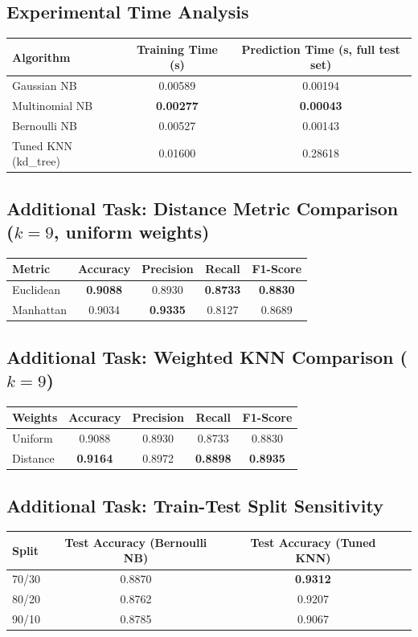 \documentclass[12pt,a4paper]{article}
\begin{document}
\subsection*{Experimental Time Analysis}
\begin{tabular}{lcc}
\toprule
Algorithm & Training Time (s) & Prediction Time (s, full test set) \\
\midrule
Gaussian NB & 0.00589 & 0.00194 \\
Multinomial NB & \textbf{0.00277} & \textbf{0.00043} \\
Bernoulli NB & 0.00527 & 0.00143 \\
Tuned KNN (kd\_tree) & 0.01600 & 0.28618 \\
\bottomrule
\end{tabular}

\subsection*{Additional Task: Distance Metric Comparison ($k=9$, uniform weights)}
\begin{tabular}{lcccc}
\toprule
Metric & Accuracy & Precision & Recall & F1-Score \\
\midrule
Euclidean & \textbf{0.9088} & 0.8930 & \textbf{0.8733} & \textbf{0.8830} \\
Manhattan & 0.9034 & \textbf{0.9335} & 0.8127 & 0.8689 \\
\bottomrule
\end{tabular}

\subsection*{Additional Task: Weighted KNN Comparison ($k=9$)}
\begin{tabular}{lcccc}
\toprule
Weights & Accuracy & Precision & Recall & F1-Score \\
\midrule
Uniform  & 0.9088 & 0.8930 & 0.8733 & 0.8830 \\
Distance & \textbf{0.9164} & 0.8972 & \textbf{0.8898} & \textbf{0.8935} \\
\bottomrule
\end{tabular}

\subsection*{Additional Task: Train-Test Split Sensitivity}
\begin{tabular}{lccc}
\toprule
Split & Test Accuracy (Bernoulli NB) & Test Accuracy (Tuned KNN) \\
\midrule
70/30 & 0.8870 & \textbf{0.9312} \\
80/20 & 0.8762 & 0.9207 \\
90/10 & 0.8785 & 0.9067 \\
\bottomrule
\end{tabular}
\end{document}
